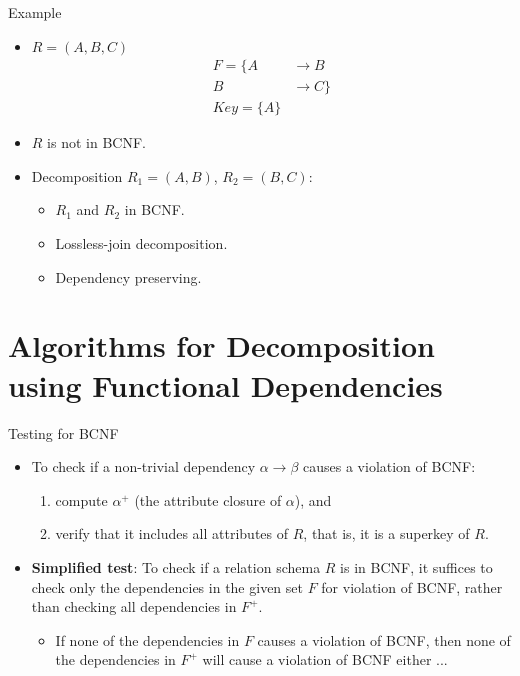 \documentclass{beamer}
\begin{document}
\begin{frame}{Example}
    \begin{itemize}
        \item $R = (A, B, C)$
            \begin{equation*}
                \begin{align*}
                    F = \{ A &\rightarrow B \\
                            B &\rightarrow C \} \\
                    Key = \{ A \}
                \end{align*}
            \end{equation*}
        \item $R$ is not in BCNF.
        \item Decomposition $R_1 = (A, B)$, $R_2 = (B, C)$:
            \begin{itemize}
                \item $R_1$ and $R_2$ in BCNF.
                \item Lossless-join decomposition.
                \item Dependency preserving.
            \end{itemize}
    \end{itemize}
\end{frame}

\section{Algorithms for Decomposition using Functional Dependencies}

\begin{frame}{Testing for BCNF}
    \footnotesize
    \begin{itemize}
        \item To check if a non-trivial dependency $\alpha \rightarrow \beta$ causes a violation of BCNF:
            \begin{enumerate}
                \item compute $\alpha^+$ (the attribute closure of $\alpha$), and
                \item verify that it includes all attributes of $R$, that is, it is a superkey of $R$.
            \end{enumerate}
        \item \textbf{Simplified test}: To check if a relation schema $R$ is in BCNF, it suffices to check only the dependencies in the given set $F$ for violation of BCNF, rather than checking all dependencies in $F^+$.
            \begin{itemize}
                \item If none of the dependencies in $F$ causes a violation of BCNF, then none of the dependencies in $F^+$ will cause a violation of BCNF either ...
            \end{itemize}
    \end{itemize}
\end{frame}
\end{document}

